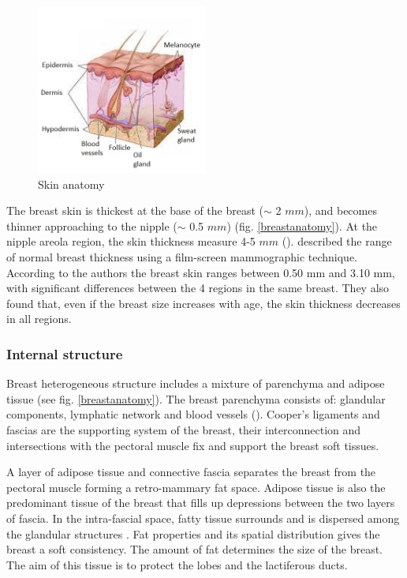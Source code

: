 \begin{center}
\begin{figure}[!h]
\centerline{\includegraphics[width=0.5\textwidth,height=0.5\textheight,keepaspectratio]{figures/skin.jpg} }
\caption{Skin anatomy}
\label{skinanatomy}
\end{figure}
\end{center}


The breast skin is thickest at the base of the breast ($\sim$ 2 $mm$), and becomes thinner approaching to the nipple ($\sim$ 0.5 $mm$) (fig. \ref{breastanatomy}). At the nipple areola region, the skin thickness measure 4-5 $mm$ (\cite{valerie_mammographic_2011}). \cite{ulger_harun_effect_2003}
described the range of normal breast thickness using a film-screen mammographic technique. According to the authors the breast skin ranges between 0.50 mm and 3.10 mm, with significant differences between the 4 regions in the same breast. They also found that, even if the breast size increases with age, the skin thickness decreases in all regions.

\subsubsection*{Internal structure}

Breast heterogeneous structure includes a mixture of parenchyma and adipose tissue (see fig. \ref{breastanatomy}). The breast parenchyma consists of: glandular components, lymphatic network and blood vessels (\cite{clemente_anatomy:_2011}). Cooper's ligaments and fascias are the supporting system of the breast, their interconnection and intersections with the pectoral muscle fix and support the breast soft tissues.

 A layer of adipose tissue and connective fascia separates the breast from the pectoral muscle forming a retro-mammary fat space. Adipose tissue is also the predominant tissue of the breast that fills up depressions between the two layers of fascia. In the intra-fascial space, fatty tissue surrounds and is dispersed among the glandular structures \cite{valerie_mammographic_2011}. Fat properties and its spatial distribution gives the breast a soft consistency. The amount of fat determines the size of the breast. The aim of this tissue is to protect the lobes and the lactiferous ducts.

